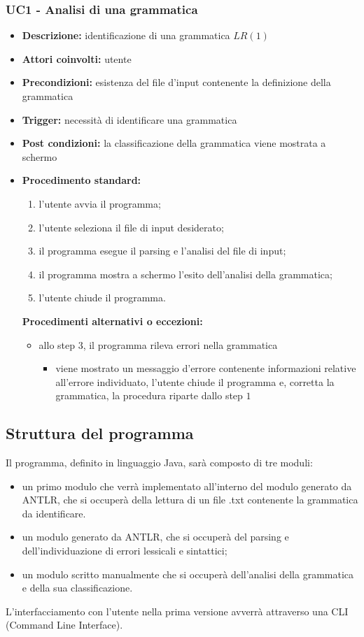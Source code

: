 \documentclass[12pt]{article}
\begin{document}
\subsubsection{UC1 - Analisi di una grammatica}
\begin{itemize}[label=]
\item \textbf{Descrizione:} identificazione di una grammatica $LR\left( 1 \right)$
\item \textbf{Attori coinvolti:} utente
\item \textbf{Precondizioni:} esistenza del file d'input contenente la definizione della grammatica
\item \textbf{Trigger:} necessità di identificare una grammatica
\item \textbf{Post condizioni:} la classificazione della grammatica viene mostrata a schermo
\item \textbf{Procedimento standard:}
\begin{enumerate}[label=\arabic*.]
\item l'utente avvia il programma;
\item l'utente seleziona il file di input desiderato;
\item il programma esegue il parsing e l'analisi del file di input;
\item il programma mostra a schermo l'esito dell'analisi della grammatica;
\item l'utente chiude il programma.
\end{enumerate}
\textbf{Procedimenti alternativi o eccezioni:}
\begin{itemize}
\item allo step $3$, il programma rileva errori nella grammatica
\begin{itemize}[label=]
\item viene mostrato un messaggio d'errore contenente informazioni relative all'errore individuato, l'utente chiude il programma e, corretta la grammatica, la procedura riparte dallo step $1$
\end{itemize}
\end{itemize}
\end{itemize}
\pagebreak

\subsection{Struttura del programma}
Il programma, definito in linguaggio Java, sarà composto di tre moduli:
\begin{itemize}
\item un primo modulo che verrà implementato all'interno del modulo generato da ANTLR, che si occuperà della lettura di un file .txt contenente la grammatica da identificare.
\item un modulo generato da ANTLR, che si occuperà del parsing e dell'individuazione di errori lessicali e sintattici;
\item un modulo scritto manualmente che si occuperà dell'analisi della grammatica e della sua classificazione.
\end{itemize}
L'interfacciamento con l'utente nella prima versione avverrà attraverso una CLI (Command Line Interface).
\end{document}
